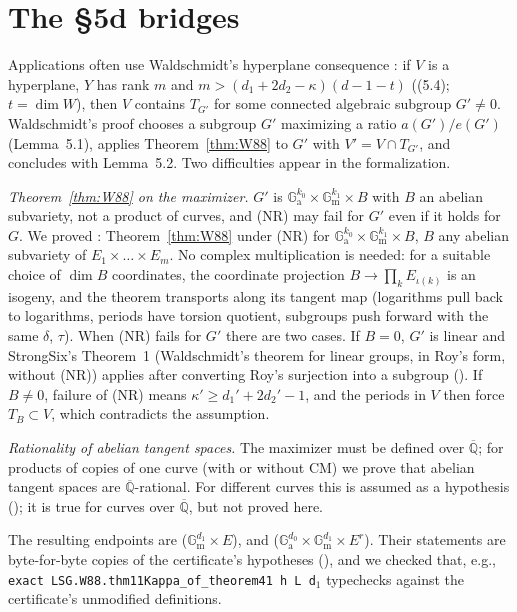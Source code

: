 \documentclass[11pt]{amsart}
\theoremstyle{definition}
\theoremstyle{remark}
\numberwithin{equation}{section}
\newcommand{\Qbar}{\overline{\mathbb{Q}}}
\newcommand{\Ga}{\mathbb{G}_{\mathrm{a}}}
\newcommand{\Gm}{\mathbb{G}_{\mathrm{m}}}
\newcommand{\NR}{\textup{(NR)}}
\begin{document}
\section{The \S5d bridges}\label{sec:5d}

Applications often use Waldschmidt's hyperplane consequence \cite[\S5d]{W88}: if $V$ is a hyperplane,
$Y$ has rank $m$ and $m>(d_1+2d_2-\kappa)(d-1-t)$ ((5.4); $t=\dim W$), then $V$ contains $T_{G'}$ for some
connected algebraic subgroup $G'\ne0$. Waldschmidt's proof chooses a subgroup $G'$ maximizing a ratio
$a(G')/e(G')$ (Lemma~5.1), applies Theorem~\ref{thm:W88} to $G'$ with $V'=V\cap T_{G'}$, and concludes with
Lemma~5.2. Two difficulties appear in the formalization.

\emph{Theorem~\ref{thm:W88} on the maximizer.} $G'$ is $\Ga^{k_0}\times\Gm^{k_1}\times B$ with $B$ an abelian
subvariety, not a product of curves, and \NR{} may fail for $G'$ even if it holds for $G$. We proved
: Theorem~\ref{thm:W88} under \NR{} for $\Ga^{k_0}\times\Gm^{k_1}\times B$, $B$ any
abelian subvariety of $E_1\times\dots\times E_m$. No complex multiplication is needed: for a suitable
choice of $\dim B$ coordinates, the coordinate projection $B\to\prod_kE_{\iota(k)}$ is an isogeny, and the
theorem transports along its tangent map (logarithms pull back to logarithms, periods have torsion
quotient, subgroups push forward with the same $\delta$, $\tau$). When \NR{} fails for $G'$ there are two
cases. If $B=0$, $G'$ is linear and StrongSix's Theorem~1 (Waldschmidt's theorem for linear groups, in
Roy's form, without \NR) applies after converting Roy's surjection into a subgroup
(). If $B\ne0$, failure of \NR{} means $\kappa'\ge d_1'+2d_2'-1$, and the periods in $V$
then force $T_B\subset V$, which contradicts the assumption.

\emph{Rationality of abelian tangent spaces.} The maximizer must be defined over $\Qbar$; for products of
copies of one curve (with or without CM) we prove that abelian tangent spaces are $\Qbar$-rational. For
different curves this is assumed as a hypothesis  (); it is true
for curves over $\Qbar$, but not proved here.

The resulting endpoints are  ($\Gm^{d_1}\times E$),
 and  ($\Ga^{d_0}\times\Gm^{d_1}\times E^r$). Their statements are
byte-for-byte copies of the certificate's hypotheses (), and we checked
that, e.g., \texttt{exact\ LSG.W88.thm11Kappa\_of\_theorem41\ h\ L\ d}$_1$ typechecks against the certificate's
unmodified definitions.
\end{document}
